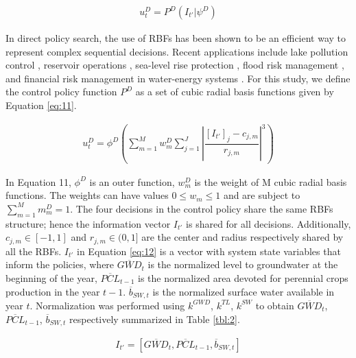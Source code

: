 \documentclass[a4paper,fleqn]{cas-sc}
\begin{document}
\begin{align}
u_{t}^D = P^{D}(I_{t'}|\psi^{D})
\end{align}

In direct policy search, the use of RBFs has been shown to be an efficient way to represent complex sequential decisions. Recent applications include lake pollution control \citep{quinn_direct_2017}, reservoir operations \citep{giuliani_universal_2014, zatarain_salazar_balancing_2017,giuliani_state---art_2021}, sea-level rise protection \citep{garner_using_2018}, flood risk management \citep{wang_incorporating_2023}, and financial risk management in water-energy systems \citep{gupta_can_2020,hamilton_stream_2022}. For this study, we define the control policy function $P^D$ as a set of cubic radial basis functions given by Equation \ref{eq:11}.

\begin{align}\label{eq:11}
u_{t}^D = \phi^{D}\left(\sum_{m=1}^M w_{m}^D \sum_{j=1}^J \left\lvert\dfrac{[I_{t'}]_{j}-c_{j,m}}{r_{j,m}}\right\rvert^{3}\right)
\end{align}

In Equation 11, $\phi^{D}$ is an outer function, $w_{m}^D$ is the weight of M cubic radial basis functions. The weights can have values $ 0 \leq w_{m} \leq 1$ and are subject to $\sum_{m=1}^M m_{m}^D= 1$. The four decisions in the control policy share the same RBFs structure; hence the information vector $I_{t'}$ is shared for all decisions. Additionally, $c_{j,m} \in [-1,1]$ and $r_{j,m} \in (0,1]$ are the center and radius respectively shared by all the RBFs. $I_{t'}$ in Equation \ref{eq:12} is a vector with system state variables that inform the policies, where $\overline{GWD}_{t}$ is the normalized level to groundwater at the beginning of the year, $\overline{PCL}_{t-1}$ is the normalized area devoted for perennial crops production in the year $t-1$. $\overline{b}_{SW,t}$ is the normalized surface water available in year $t$. Normalization was performed using $k^{GWD}$, $k^{TL}$, $k^{SW}$ to obtain $\overline{GWD}_{t}$, $\overline{PCL}_{t-1}$, $\overline{b}_{SW,t}$ respectively summarized in Table \ref{tbl:2}.

\begin{align}\label{eq:12}
I_{t'} = [\overline{GWD}_{t},\overline{PCL}_{t-1},\overline{b}_{SW,t}]
\end{align}
\end{document}
